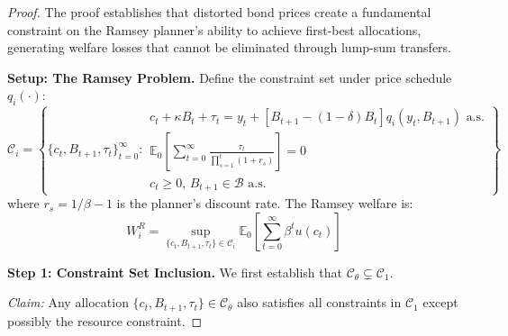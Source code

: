 \documentclass[12pt]{article}
\theoremstyle{plain}
\begin{document}
\begin{proof}
	The proof establishes that distorted bond prices create a fundamental constraint on the Ramsey planner's ability to achieve first-best allocations, generating welfare losses that cannot be eliminated through lump-sum transfers.

	\textbf{Setup: The Ramsey Problem.} Define the constraint set under price schedule $q_i(\cdot)$:
	\begin{equation}
		\mathcal{C}_i = \left\{ \{c_t, B_{t+1}, \tau_t\}_{t=0}^\infty : \begin{array}{l}
			c_t + \kappa B_t + \tau_t = y_t + [B_{t+1} - (1-\delta)B_t]q_i(y_t, B_{t+1}) \text{ a.s.} \\
			\mathbb{E}_0 \left[ \sum_{t=0}^\infty \frac{\tau_t}{\prod_{s=1}^t (1+r_s)} \right] = 0    \\
			c_t \geq 0, \, B_{t+1} \in \mathcal{B} \text{ a.s.}
		\end{array} \right\} \label{eq:constraint_set_full}
	\end{equation}
	where $r_s = 1/\beta - 1$ is the planner's discount rate. The Ramsey welfare is:
	\begin{equation}
		W^R_i = \sup_{\{c_t, B_{t+1}, \tau_t\} \in \mathcal{C}_i} \mathbb{E}_0 \left[ \sum_{t=0}^\infty \beta^t u(c_t) \right] \label{eq:ramsey_welfare_complete}
	\end{equation}

	\textbf{Step 1: Constraint Set Inclusion.} We first establish that $\mathcal{C}_\theta \subsetneq \mathcal{C}_1$.

	\textit{Claim:} Any allocation $\{c_t, B_{t+1}, \tau_t\} \in \mathcal{C}_\theta$ also satisfies all constraints in $\mathcal{C}_1$ except possibly the resource constraint.


\end{proof}
\end{document}
